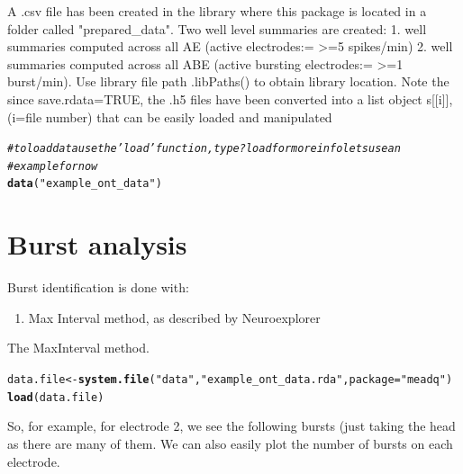 \documentclass{article}\usepackage[]{graphicx}\usepackage[]{color}
\makeatletter
\newcommand{\hlstr}[1]{\textcolor[rgb]{0.192,0.494,0.8}{#1}}%
\newcommand{\hlcom}[1]{\textcolor[rgb]{0.678,0.584,0.686}{\textit{#1}}}%
\newcommand{\hlstd}[1]{\textcolor[rgb]{0.345,0.345,0.345}{#1}}%
\newcommand{\hlkwb}[1]{\textcolor[rgb]{0.69,0.353,0.396}{#1}}%
\newcommand{\hlkwc}[1]{\textcolor[rgb]{0.333,0.667,0.333}{#1}}%
\newcommand{\hlkwd}[1]{\textcolor[rgb]{0.737,0.353,0.396}{\textbf{#1}}}%
\newenvironment{kframe}{%
 \def\at@end@of@kframe{}%
 \ifinner\ifhmode%
  \def\at@end@of@kframe{\end{minipage}}%
  \begin{minipage}{\columnwidth}%
 \fi\fi%
 \def\FrameCommand##1{\hskip\@totalleftmargin \hskip-\fboxsep
 \colorbox{shadecolor}{##1}\hskip-\fboxsep
     \hskip-\linewidth \hskip-\@totalleftmargin \hskip\columnwidth}%
 \MakeFramed {\advance\hsize-\width
   \@totalleftmargin\z@ \linewidth\hsize
   \@setminipage}}%
 {\par\unskip\endMakeFramed%
 \at@end@of@kframe}
\newenvironment{knitrout}{}{} %
\makeatother
\begin{document}
A .csv file has been created in the library where this package is located in a folder called "prepared_data".  Two well level summaries are created: 1. well summaries computed across all AE (active electrodes:= >=5 spikes/min) 2. well summaries computed across all ABE (active bursting electrodes:= >=1 burst/min).  Use library file path .libPaths() to obtain library location.
Note the since save.rdata=TRUE, the .h5 files have been converted into a list object s[[i]], 
(i=file number) that can be easily loaded and manipulated

\begin{knitrout}
\color{fgcolor}\begin{kframe}
\begin{alltt}
\hlcom{# to load data use the 'load' function, type ?load for more info lets use an}
\hlcom{# example for now}
\hlkwd{data}\hlstd{(}\hlstr{"example_ont_data"}\hlstd{)}
\end{alltt}
\end{kframe}
\end{knitrout}




\section*{Burst analysis}

Burst identification is done with:
\begin{enumerate}
\item Max Interval method, as described by Neuroexplorer \citep{neuroexplorer}

\end{enumerate}

The MaxInterval method.
\begin{knitrout}
\color{fgcolor}\begin{kframe}
\begin{alltt}
\hlstd{data.file} \hlkwb{<-} \hlkwd{system.file}\hlstd{(}\hlstr{"data"}\hlstd{,} \hlstr{"example_ont_data.rda"}\hlstd{,} \hlkwc{package} \hlstd{=} \hlstr{"meadq"}\hlstd{)}
\hlkwd{load}\hlstd{(data.file)}
\end{alltt}
\end{kframe}
\end{knitrout}


So, for example, for electrode 2, we see the following bursts (just
taking the head as there are many of them.  We can also easily plot
the number of bursts on each electrode.
\end{document}
